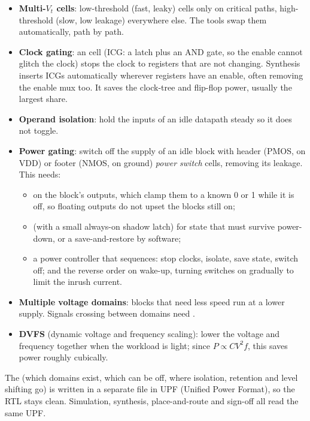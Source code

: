 \begin{itemize}
  \item \textbf{Multi-$V_t$ cells}: low-threshold (fast, leaky) cells only on critical paths, high-threshold (slow, low leakage) everywhere else. The tools swap them automatically, path by path.
  \item \textbf{Clock gating}: an  cell (ICG: a latch plus an AND gate, so the enable cannot glitch the clock) stops the clock to registers that are not changing. Synthesis inserts ICGs automatically wherever registers have an enable, often removing the enable mux too. It saves the clock-tree and flip-flop power, usually the largest share.
  \item \textbf{Operand isolation}: hold the inputs of an idle datapath steady so it does not toggle.
  \item \textbf{Power gating}: switch off the supply of an idle block with header (PMOS, on VDD) or footer (NMOS, on ground) \emph{power switch} cells, removing its leakage. This needs:
  \begin{itemize}
    \item {} on the block's outputs, which clamp them to a known 0 or 1 while it is off, so floating outputs do not upset the blocks still on;
    \item {} (with a small always-on shadow latch) for state that must survive power-down, or a save-and-restore by software;
    \item a power controller that sequences: stop clocks, isolate, save state, switch off; and the reverse order on wake-up, turning switches on gradually to limit the inrush current.
  \end{itemize}
  \item \textbf{Multiple voltage domains}: blocks that need less speed run at a lower supply. Signals crossing between domains need .
  \item \textbf{DVFS} (dynamic voltage and frequency scaling): lower the voltage and frequency together when the workload is light; since $P \propto CV^2f$, this saves power roughly cubically.
\end{itemize}

The  (which domains exist, which can be off, where isolation, retention and level shifting go) is written in a separate file in UPF (Unified Power Format), so the RTL stays clean. Simulation, synthesis, place-and-route and sign-off all read the same UPF.


